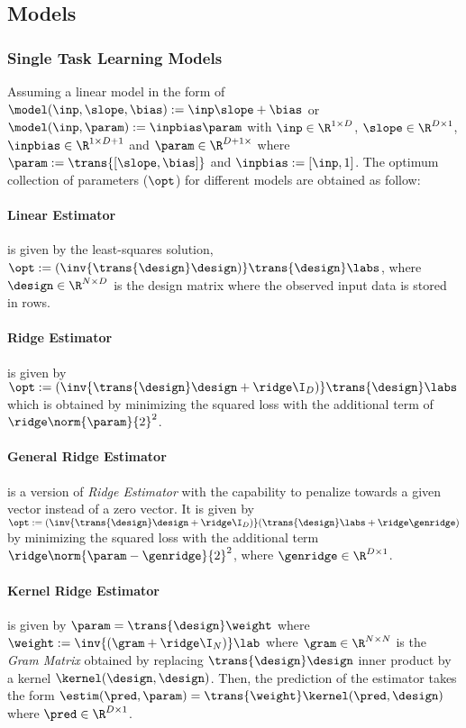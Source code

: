 \subsection{Models} 

\subsubsection{Single Task Learning Models}

Assuming a linear model in the form of $\model(\inp,\slope,\bias):=\inp\slope+\bias$ or $\model(\inp, \param):=\inpbias\param$ with $\inp\in\R^{1\times D}$, $\slope\in\R^{D\times 1}$, $\inpbias\in\R^{1\times D+1}$ and $\param\in\R^{D+1\times}$ where $\param:=\trans{[\slope, \bias]}$ and $\inpbias:=[\inp, 1]$. The optimum collection of parameters ($\opt$) for different models are obtained as follow:

\paragraph{Linear Estimator} is given by the least-squares solution, $\opt:=(\inv{\trans{\design}\design)}\trans{\design}\labs$, where $\design\in\R^{N\times D}$ is the design matrix where the observed input data is stored in rows.

\paragraph{Ridge Estimator} is given by $\opt:=(\inv{\trans{\design}\design+\ridge \I_{D})}\trans{\design}\labs$ which is obtained by minimizing the squared loss with the additional term of $\ridge\norm{\param}{2}^2$.

\paragraph{General Ridge Estimator} is a version of \textit{Ridge Estimator} with the capability to penalize towards a given vector instead of a zero vector. It is given by $\opt:=(\inv{\trans{\design}\design+\ridge \I_{D})}(\trans{\design}\labs+\ridge\genridge)$ by minimizing the squared loss with the additional term $\ridge\norm{\param-\genridge}{2}^2$, where $\genridge\in\R^{D\times 1}$.   

\paragraph{Kernel Ridge Estimator} is given by $\param = \trans{\design}\weight$ where $\weight:=\inv{(\gram+\ridge\I_{N})}\lab$ where $\gram\in\R^{N\times N}$ is the  \textit{Gram Matrix} obtained by replacing $\trans{\design}\design$ inner product by a kernel $\kernel(\design, \design)$. Then, the prediction of the estimator takes the form $\estim(\pred,\param)=\trans{\weight}\kernel(\pred,\design)$ where $\pred\in\R^{D\times 1}$.

